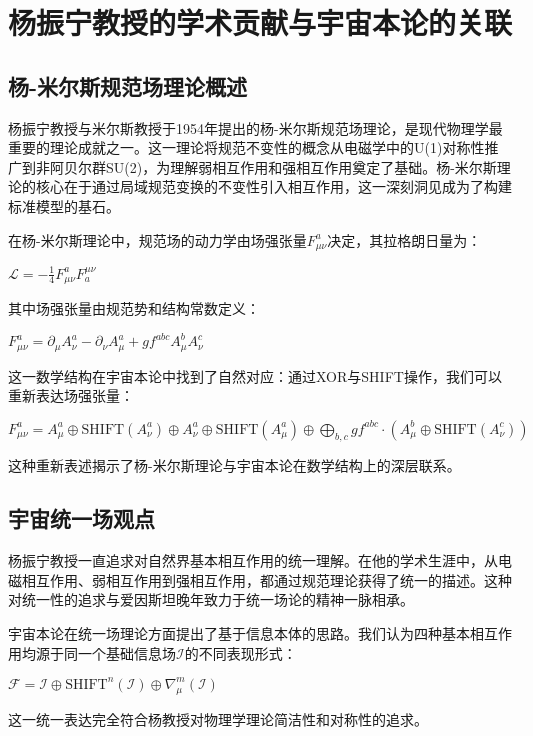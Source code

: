 \chapter{杨振宁教授的学术贡献与宇宙本论的关联}

\section{杨-米尔斯规范场理论概述}

杨振宁教授与米尔斯教授于1954年提出的杨-米尔斯规范场理论，是现代物理学最重要的理论成就之一。这一理论将规范不变性的概念从电磁学中的U(1)对称性推广到非阿贝尔群SU(2)，为理解弱相互作用和强相互作用奠定了基础。杨-米尔斯理论的核心在于通过局域规范变换的不变性引入相互作用，这一深刻洞见成为了构建标准模型的基石。

在杨-米尔斯理论中，规范场的动力学由场强张量$F_{\mu\nu}^a$决定，其拉格朗日量为：

$\mathcal{L} = -\frac{1}{4}F_{\mu\nu}^a F^{\mu\nu}_a$

其中场强张量由规范势和结构常数定义：

$F_{\mu\nu}^a = \partial_{\mu}A_{\nu}^a - \partial_{\nu}A_{\mu}^a + g f^{abc}A_{\mu}^b A_{\nu}^c$

这一数学结构在宇宙本论中找到了自然对应：通过XOR与SHIFT操作，我们可以重新表达场强张量：

$F_{\mu\nu}^a = A_{\mu}^a \oplus \text{SHIFT}(A_{\nu}^a) \oplus A_{\nu}^a \oplus \text{SHIFT}(A_{\mu}^a) \oplus \bigoplus_{b,c} g f^{abc} \cdot (A_{\mu}^b \oplus \text{SHIFT}(A_{\nu}^c))$

这种重新表述揭示了杨-米尔斯理论与宇宙本论在数学结构上的深层联系。

\section{宇宙统一场观点}

杨振宁教授一直追求对自然界基本相互作用的统一理解。在他的学术生涯中，从电磁相互作用、弱相互作用到强相互作用，都通过规范理论获得了统一的描述。这种对统一性的追求与爱因斯坦晚年致力于统一场论的精神一脉相承。

宇宙本论在统一场理论方面提出了基于信息本体的思路。我们认为四种基本相互作用均源于同一个基础信息场$\mathcal{I}$的不同表现形式：

$\mathcal{F} = \mathcal{I} \oplus \text{SHIFT}^n(\mathcal{I}) \oplus \nabla_{\mu}^m(\mathcal{I})$

这一统一表达完全符合杨教授对物理学理论简洁性和对称性的追求。

